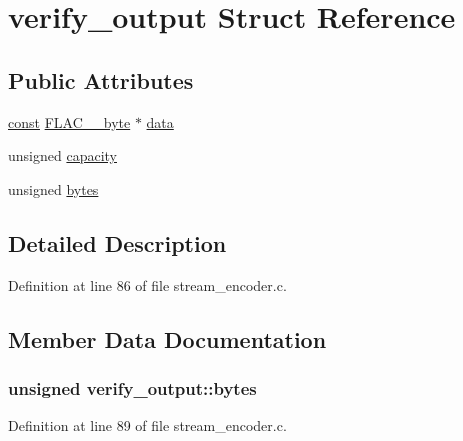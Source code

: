 \hypertarget{structverify__output}{}\section{verify\+\_\+output Struct Reference}
\label{structverify__output}
\subsection*{Public Attributes}
\begin{DoxyCompactItemize}
\item 
\hyperlink{getopt1_8c_a2c212835823e3c54a8ab6d95c652660e}{const} \hyperlink{ordinals_8h_a5eb569b12d5b047cdacada4d57924ee3}{F\+L\+A\+C\+\_\+\+\_\+byte} $\ast$ \hyperlink{structverify__output_a8fc7345f6fe84007dedfb5848a015d63}{data}
\item 
unsigned \hyperlink{structverify__output_a8f91830b856ad6135e69e72986717257}{capacity}
\item 
unsigned \hyperlink{structverify__output_aa2a9bd45b9789afa9642f8302daba8bd}{bytes}
\end{DoxyCompactItemize}


\subsection{Detailed Description}


Definition at line 86 of file stream\+\_\+encoder.\+c.



\subsection{Member Data Documentation}
\subsubsection[{\texorpdfstring{bytes}{bytes}}]{\setlength{\rightskip}{0pt plus 5cm}unsigned verify\+\_\+output\+::bytes}\hypertarget{structverify__output_aa2a9bd45b9789afa9642f8302daba8bd}{}\label{structverify__output_aa2a9bd45b9789afa9642f8302daba8bd}


Definition at line 89 of file stream\+\_\+encoder.\+c.

